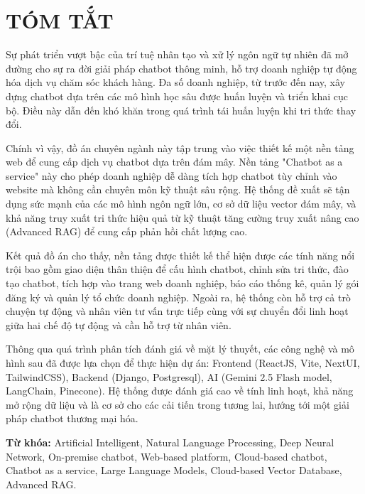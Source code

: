 \clearpage
\section*{TÓM TẮT}
Sự phát triển vượt bậc của trí tuệ nhân tạo và xử lý ngôn ngữ tự nhiên đã mở đường cho sự ra đời giải pháp chatbot thông minh, hỗ trợ doanh nghiệp tự động hóa dịch vụ chăm sóc khách hàng. Đa số doanh nghiệp, từ trước đến nay, xây dựng chatbot dựa trên các mô hình học sâu được huấn luyện và triển khai cục bộ. Điều này dẫn đến khó khăn trong quá trình tái huấn luyện khi tri thức thay đổi. 
\vspace{0.5cm}

Chính vì vậy, đồ án chuyên ngành này tập trung vào việc thiết kế một nền tảng web để cung cấp dịch vụ chatbot dựa trên đám mây. Nền tảng "Chatbot as a service" này cho phép doanh nghiệp dễ dàng tích hợp chatbot tùy chỉnh vào website mà không cần chuyên môn kỹ thuật sâu rộng. Hệ thống đề xuất sẽ tận dụng sức mạnh của các mô hình ngôn ngữ lớn, cơ sở dữ liệu vector đám mây, và khả năng truy xuất tri thức hiệu quả từ kỹ thuật tăng cường truy xuất nâng cao (Advanced RAG) để cung cấp phản hồi chất lượng cao.
\vspace{0.5cm}

Kết quả đồ án cho thấy, nền tảng được thiết kế thể hiện được các tính năng nổi trội bao gồm giao diện thân thiện để cấu hình chatbot, chỉnh sửa tri thức, đào tạo chatbot, tích hợp vào trang web doanh nghiệp, báo cáo thống kê, quản lý gói đăng ký và quản lý tổ chức doanh nghiệp. Ngoài ra, hệ thống còn hỗ trợ cả trò chuyện tự động và nhân viên tư vấn trực tiếp cùng với sự chuyển đổi linh hoạt giữa hai chế độ tự động và cần hỗ trợ từ nhân viên. 
\vspace{0.5cm}

Thông qua quá trình phân tích đánh giá về mặt lý thuyết, các công nghệ và mô hình sau đã được lựa chọn để thực hiện dự án: Frontend (ReactJS, Vite, NextUI, TailwindCSS), Backend (Django, Postgresql), AI (Gemini 2.5 Flash model, LangChain, Pinecone). Hệ thống được đánh giá cao về tính linh hoạt, khả năng mở rộng dữ liệu và là cơ sở cho các cải tiến trong tương lai, hướng tới một giải pháp chatbot thương mại hóa. \\
\vspace{0.5cm}

\textbf{Từ khóa:} Artificial Intelligent, Natural Language Processing, Deep Neural Network, On-premise chatbot, Web-based platform, Cloud-based chatbot, Chatbot as a service, Large Language Models, Cloud-based Vector Database, Advanced RAG.

